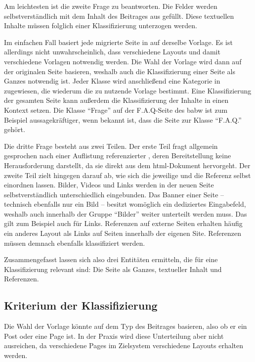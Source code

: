         Am leichtesten ist die zweite Frage zu beantworten.
        Die Felder werden selbstverständlich mit dem Inhalt des Beitrages
        aus {\wordpress} gefüllt.
        Diese textuellen Inhalte müssen folglich einer Klassifizierung unterzogen werden.
        
        Im einfachen Fall basiert jede migrierte Seite in {\imperia} auf derselbe Vorlage.
        Es ist allerdings nicht unwahrscheinlich,
        dass verschiedene Layouts und damit verschiedene Vorlagen
        notwendig werden.
        Die Wahl der Vorlage wird dann auf der originalen Seite basieren,
        weshalb auch die Klassifizierung einer Seite als Ganzes notwendig ist.
        Jeder Klasse wird anschließend eine Kategorie in {\imperia}
        zugewiesen, die wiederum die zu nutzende Vorlage bestimmt.
        Eine Klassifizierung der gesamten Seite kann außerdem die
        Klassifizierung der Inhalte in einen Kontext setzen.
        Die Klasse "`Frage"' auf der F.A.Q-Seite des \gls{babw}
        ist zum Beispiel aussagekräftiger, wenn bekannt ist,
        dass die Seite zur Klasse "`F.A.Q."' gehört.

        Die dritte Frage besteht aus zwei Teilen.
        Der erste Teil fragt allgemein gesprochen nach einer Auflistung referenzierter {\resources},
        deren Bereitstellung keine Herausforderung darstellt,
        da sie direkt aus dem \gls{html}-Dokument hervorgeht.
        Der zweite Teil zielt hingegen darauf ab,
        wie sich die jeweilige {\resource} und die Referenz selbst einordnen lassen.
        Bilder, Videos und Links werden in der neuen Seite selbstverständlich
        unterschiedlich eingebunden.
        Das Banner einer Seite -- technisch ebenfalls nur ein Bild --
        besitzt womöglich ein dediziertes Eingabefeld,
        weshalb auch innerhalb der Gruppe "`Bilder"' weiter unterteilt werden muss.
        Das gilt zum Beispiel auch für Links.
        Referenzen auf externe Seiten erhalten häufig ein anderes Layout als Links
        auf Seiten innerhalb der eigenen Site.
        Referenzen müssen demnach ebenfalls klassifiziert werden.

        Zusammengefasst lassen sich also drei Entitäten ermitteln,
        die für eine Klassifizierung relevant sind:
        Die Seite als Ganzes, textueller Inhalt und Referenzen.

    \subsection{Kriterium der Klassifizierung}
        Die Wahl der Vorlage könnte auf dem Typ des Beitrages basieren,
        also ob er ein Post oder eine Page ist.
        In der Praxis wird diese Unterteilung aber nicht ausreichen,
        da verschiedene Pages im Zielsystem verschiedene Layouts erhalten werden.

